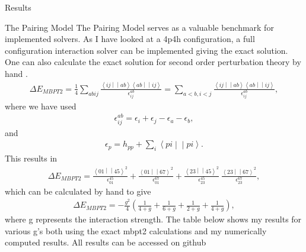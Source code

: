 \documentclass[twoside,english]{uiofysmaster}
\begin{document}
\begin{chapter}{Results}
	
	\begin{section}{The Pairing Model}
		The Pairing Model serves as a valuable benchmark for implemented solvers. As I have looked at a 4p4h configuration, a full configuration interaction solver can be implemented giving the exact solution. One can also calculate the exact solution for second order perturbation theory by hand \cite{Hjorth-Jensen2016}. 
		\begin{align}
			\Delta E_{MBPT2} = \frac{1}{4} \sum_{abij} \frac{\left<ij\middle|\middle|ab\right>\left<ab\middle|\middle|ij\right>}{\epsilon_{ij}^{ab}} = 
			\sum_{a<b,i<j} \frac{\left<ij\middle|\middle|ab\right>\left<ab\middle|\middle|ij\right>}{\epsilon_{ij}^{ab}},
		\end{align}
		where we have used
		\begin{align}
			\epsilon_{ij}^{ab} = \epsilon_i + \epsilon_j - \epsilon_a - \epsilon_b,
		\end{align}
		and
		\begin{align}
			\epsilon_p = h_{pp} + \sum_i \left<pi\middle|\middle|pi\right>.
		\end{align}
		This results in
		\begin{align}
			\Delta E_{MBPT2} = \frac{\left<01\middle|\middle|45\right>^2}{\epsilon_{01}^{45} } + \frac{\left<01\middle|\middle|67\right>^2}{\epsilon_{01}^{67} }
							  +\frac{\left<23\middle|\middle|45\right>^2}{\epsilon_{23}^{45} } \ \frac{\left<23\middle|\middle|67\right>^2}{\epsilon_{23}^{67} },
		\end{align}
		which can be calculated by hand to give
		\begin{align}
			\Delta E_{MBPT2} = -\frac{g^2}{4} \left( \frac{1}{4+g} + \frac{1}{6+g} + \frac{1}{2+g} + \frac{1}{4+g} \right),
		\end{align}
		where g represents the interaction strength. The table below shows my results for various g's both using the exact mbpt2 calculations and my numerically computed results. All results can be accessed on github \cite{WholmenGithub}


\end{section}
\end{chapter}
\end{document}
